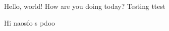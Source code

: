 \documentclass{article}
\begin{document}
Hello, world! How are you doing today? Testing ttest



Hi naosfo s
pdoo
\end{document}
